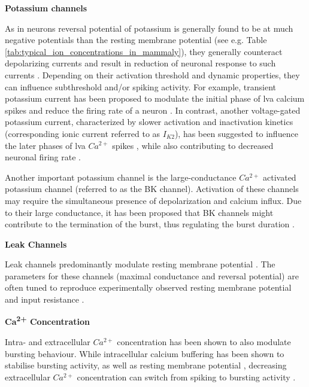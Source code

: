 \documentclass[../main.tex]{subfiles}
\begin{document}
\noindent\textbf{Potassium channels}

As in neurons reversal potential of potassium is generally found to be at much negative potentials than the resting membrane potential (see e.g. Table \ref{tab:typical_ion_concentrations_in_mammaly}), they generally counteract depolarizing currents and result in reduction of neuronal response to such currents \parencite{mccormickModelElectrophysiologicalProperties1992}. Depending on their activation threshold and dynamic properties, they can influence subthreshold and/or spiking activity. For example, transient potassium current has been proposed to modulate the initial phase of \gls{lva} calcium spikes \parencite{huguenardSimulationCurrentsInvolved1992} and reduce the firing rate of a neuron \parencite{mccormickModelElectrophysiologicalProperties1992}. In contrast, another voltage-gated potassium current, characterized by slower activation and inactivation kinetics (corresponding ionic current referred to as $I_{K2}$), has been suggested to influence the later phases of \gls{lva} $Ca^{2+}$ spikes \parencite{huguenardSimulationCurrentsInvolved1992}, while also contributing to decreased neuronal firing rate \parencite{mccormickModelElectrophysiologicalProperties1992}.

Another important potassium channel is the large-conductance $Ca^{2+}$ activated potassium channel (referred to as the BK channel). Activation of these channels may require the simultaneous presence of depolarization and calcium influx. Due to their large conductance, it has been proposed that BK channels might contribute to the termination of the burst, thus regulating the burst
duration \parencite{liuMultipleConductancesCooperatively2008}.

\noindent\textbf{Leak Channels}

Leak channels predominantly modulate resting membrane potential \parencite{mccormickModelElectrophysiologicalProperties1992,amarilloInterplaySevenSubthreshold2014}. The parameters for these channels (maximal conductance and reversal potential) are often tuned to reproduce experimentally observed resting membrane potential and input resistance \parencite{wangMultipleDynamicalModes1994}.

\noindent \textbf{Ca\textsuperscript{2+} Concentration}

Intra- and extracellular $Ca^{2+}$ concentration has been shown to also modulate bursting behaviour. While intracellular calcium buffering has been shown to stabilise bursting activity, as well as resting membrane potential \parencite{liuMultipleConductancesCooperatively2008}, decreasing extracellular $Ca^{2+}$ concentration can switch from spiking to bursting activity \parencite{golombContributionPersistentNa2006}.
\end{document}
